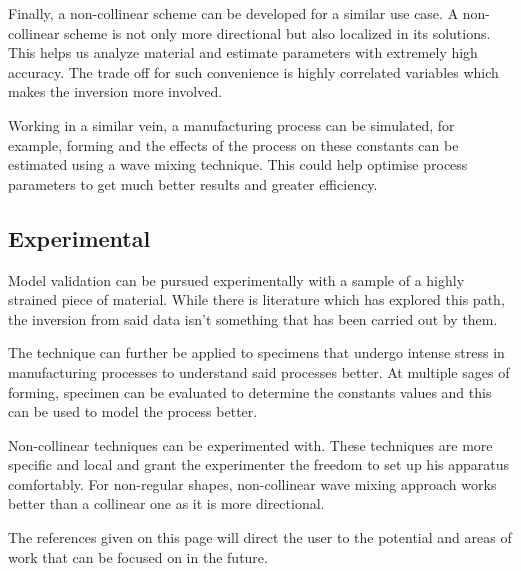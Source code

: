 Finally, a non-collinear scheme can be developed for a similar use case. A non-collinear scheme is not only more directional but also localized in its solutions. This helps us analyze material and estimate parameters with extremely high accuracy. The trade off for such convenience is highly correlated variables which makes the inversion more involved.

Working in a similar vein, a manufacturing process can be simulated, for example, forming and the effects of the process on these constants can be estimated using a wave mixing technique. This could help optimise process parameters to get much better results and greater efficiency.

\subsection{Experimental}

Model validation can be pursued experimentally with a sample of a highly strained piece of material. While there is literature which has explored this path, the inversion from said data isn't something that has been carried out by them.

The technique can further be applied to specimens that undergo intense stress in manufacturing processes to understand said processes better. At multiple sages of forming, specimen can be evaluated to determine the constants values and this can be used to model the process better.

Non-collinear techniques can be experimented with. These techniques are more specific and local and grant the experimenter the freedom to set up his apparatus comfortably. For non-regular shapes, non-collinear wave mixing approach works better than a collinear one as it is more directional.

The references given on this page will direct the user to the potential and areas of work that can be focused on in the future.